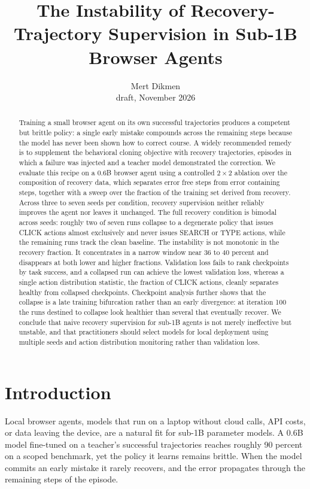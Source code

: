 \documentclass[11pt]{article}
\title{The Instability of Recovery-Trajectory Supervision in Sub-1B Browser Agents}
\author{Mert Dikmen\\\small draft, November 2026}
\date{}
\begin{document}
\maketitle

\begin{abstract}
Training a small browser agent on its own successful trajectories produces a
competent but brittle policy: a single early mistake compounds across the
remaining steps because the model has never been shown how to correct course. A
widely recommended remedy is to supplement the behavioral cloning objective
with recovery trajectories, episodes in which a failure was injected and a
teacher model demonstrated the correction. We evaluate this recipe on a 0.6B
browser agent using a controlled $2\times2$ ablation over the composition of
recovery data, which separates error free steps from error containing steps,
together with a sweep over the fraction of the training set derived from
recovery. Across three to seven seeds per condition, recovery supervision
neither reliably improves the agent nor leaves it unchanged. The full recovery
condition is bimodal across seeds: roughly two of seven runs collapse to a
degenerate policy that issues CLICK actions almost exclusively and never issues
SEARCH or TYPE actions, while the remaining runs track the clean baseline. The
instability is not monotonic in the recovery fraction. It concentrates in a
narrow window near 36 to 40 percent and disappears at both lower and higher
fractions. Validation loss fails to rank checkpoints by task success, and a
collapsed run can achieve the lowest validation loss, whereas a single action
distribution statistic, the fraction of CLICK actions, cleanly separates
healthy from collapsed checkpoints. Checkpoint analysis further shows that the
collapse is a late training bifurcation rather than an early divergence: at
iteration 100 the runs destined to collapse look healthier than several that
eventually recover. We conclude that naive recovery supervision for sub-1B
agents is not merely ineffective but unstable, and that practitioners should
select models for local deployment using multiple seeds and action distribution
monitoring rather than validation loss.
\end{abstract}

\section{Introduction}

Local browser agents, models that run on a laptop without cloud calls, API
costs, or data leaving the device, are a natural fit for sub-1B parameter
models. A 0.6B model fine-tuned on a teacher's successful trajectories reaches
roughly 90 percent on a scoped benchmark, yet the policy it learns remains
brittle. When the model commits an early mistake it rarely recovers, and the
error propagates through the remaining steps of the episode.
\end{document}
